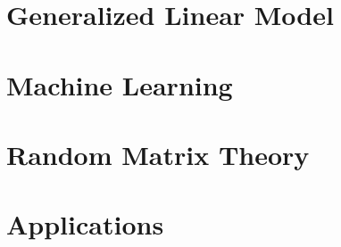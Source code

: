 \documentclass[12pt]{prettybook}
\begin{document}
\part{Generalized Linear Model}






\part{Machine Learning}





\part{Random Matrix Theory}

\part{Applications}


\appendix

\backmatter
\nocite{*}
\printbibliography
\end{document}
